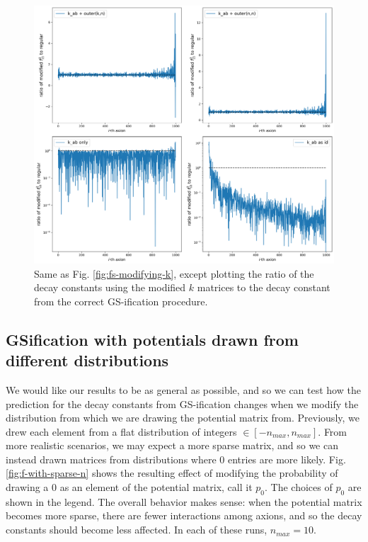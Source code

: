 \documentclass[11pt]{article}
\begin{document}
\begin{figure}[h]
    \centering
    \includegraphics[width=0.95\linewidth]{figs/f_ratios_comparisons.png}
    \caption{Same as Fig. \ref{fig:fs-modifying-k}, except plotting the ratio of the decay constants using the modified $k$ matrices to the decay constant from the correct GS-ification procedure.}
    \label{fig:fs-modifying-k-ratios}
\end{figure}

\pagebreak 

\subsection{GSification with potentials drawn from different distributions}

We would like our results to be as general as possible, and so we can test how the prediction for the decay constants from GS-ification changes when we modify the distribution from which we are drawing the potential matrix from. Previously, we drew each element from a flat distribution of integers $\in [-n_{max},n_{max}]$. From more realistic scenarios, we may expect a more sparse matrix, and so we can instead drawn matrices from distributions where 0 entries are more likely. Fig. \ref{fig:f-with-sparse-n} shows the resulting effect of modifying the probability of drawing a 0 as an element of the potential matrix, call it $p_0$. The choices of $p_0$ are shown in the legend. The overall behavior makes sense: when the potential matrix becomes more sparse, there are fewer interactions among axions, and so the decay constants should become less affected. In each of these runs, $n_{max}=10$.
\end{document}
